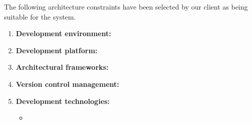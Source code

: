\begin{flushleft}
	The following architecture constraints have 
	been selected by our client as being 
	suitable for the system.
\end{flushleft}

\begin{enumerate}
	
	\item \textbf{Development environment:}
	\item \textbf{Development platform:}  
	\item \textbf{Architectural frameworks:} 
	\item \textbf{Version control management:} 
	\item \textbf{Development technologies:}	
	\begin{itemize}
		\item 
	\end{itemize}
		
\end{enumerate}